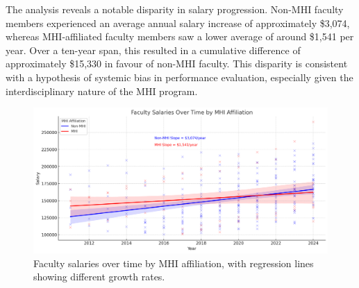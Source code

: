 \documentclass{article}
\begin{document}
The analysis reveals a notable disparity in salary progression. Non-MHI faculty members experienced an average annual salary increase of approximately \$3,074, whereas MHI-affiliated faculty members saw a lower average of around \$1,541 per year. Over a ten-year span, this resulted in a cumulative difference of approximately \$15,330 in favour of non-MHI faculty. This disparity is consistent with a hypothesis of systemic bias in performance evaluation, especially given the interdisciplinary nature of the MHI program. 
\vspace{-10em}
\begin{figure}[b]
    \centering
    \includegraphics[width=.72\textwidth]{figures/scatter.png}
    \caption{Faculty salaries over time by MHI affiliation, with regression lines showing different growth rates.}
    \label{fig:scatter_plot}
\end{figure}

\newpage
\printbibliography
\end{document}
